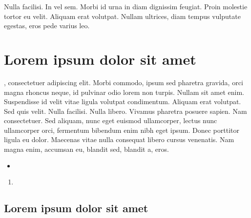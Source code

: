 \begin{savequote}[85mm]
	\small{Nulla facilisi. In vel sem. Morbi id urna in diam dignissim feugiat. Proin molestie tortor eu velit. Aliquam erat volutpat. Nullam ultrices, diam tempus vulputate egestas, eros pede varius leo.
		}
\end{savequote}

\chapter{Lorem ipsum dolor sit amet}
\label{chap:capitulo3}

, consectetuer adipiscing elit. Morbi commodo, ipsum sed pharetra gravida, orci magna rhoncus neque, id pulvinar odio lorem non turpis. Nullam sit amet enim. Suspendisse id velit vitae ligula volutpat condimentum. Aliquam erat volutpat. Sed quis velit. Nulla facilisi. Nulla libero. Vivamus pharetra posuere sapien. Nam consectetuer. Sed aliquam, nunc eget euismod ullamcorper, lectus nunc ullamcorper orci, fermentum bibendum enim nibh eget ipsum. Donec porttitor ligula eu dolor. Maecenas vitae nulla consequat libero cursus venenatis. Nam magna enim, accumsan eu, blandit sed, blandit a, eros.

\begin{itemize}
	\item \lipsum[2]
\end{itemize}

\lipsum[3]

\begin{enumerate}
	\item \lipsum[4]
\end{enumerate}

\lipsum[17]

\section{Lorem ipsum dolor sit amet}

\lipsum[17]


